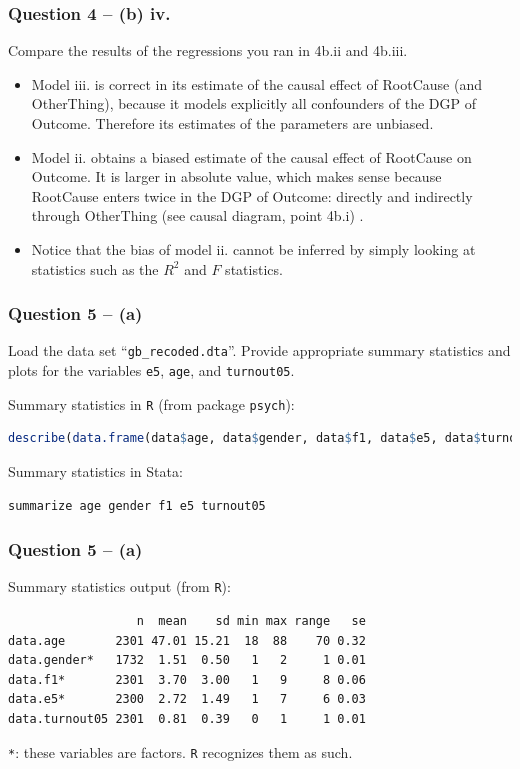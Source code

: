\documentclass[xcolor=table]{beamer}
\begin{document}
\begin{frame}
\frametitle{Question 4 -- (b) iv.}
Compare the results of the regressions you ran in 4b.ii and 4b.iii.  \pause

\begin{itemize}
\item Model iii. is correct in its estimate of the causal effect of RootCause (and OtherThing), because it models explicitly all confounders of the DGP of Outcome. \pause Therefore its estimates of the parameters are unbiased. \pause

\item Model ii. obtains a biased estimate of the causal effect of RootCause on Outcome. \pause It is larger in absolute value, which makes sense because RootCause enters twice in the DGP of Outcome: directly and indirectly through OtherThing (see causal diagram, point 4b.i) \pause.

\item Notice that the bias of model ii. cannot be inferred by simply looking at statistics such as the $R^2$ and $F$ statistics.
\end{itemize}
\end{frame}

\begin{frame}[fragile]
\frametitle{Question 5 -- (a)}
Load the data set ``\texttt{gb\_recoded.dta}''. Provide appropriate summary statistics and plots for the variables \texttt{e5}, \texttt{age}, and
\texttt{turnout05}. \pause

Summary statistics in \texttt{R} (from package \texttt{psych}):
\begin{lstlisting}[language = R]
describe(data.frame(data$age, data$gender, data$f1, data$e5, data$turnout05))
\end{lstlisting} \pause

Summary statistics in Stata:
\begin{lstlisting}
summarize age gender f1 e5 turnout05 
\end{lstlisting}
\end{frame}

\begin{frame}[fragile]
\frametitle{Question 5 -- (a)}
Summary statistics output (from \texttt{R}):
\begin{lstlisting}
                  n  mean    sd min max range   se
data.age       2301 47.01 15.21  18  88    70 0.32
data.gender*   1732  1.51  0.50   1   2     1 0.01
data.f1*       2301  3.70  3.00   1   9     8 0.06
data.e5*       2300  2.72  1.49   1   7     6 0.03
data.turnout05 2301  0.81  0.39   0   1     1 0.01
\end{lstlisting} \pause

\texttt{*}: these variables are factors. \texttt{R} recognizes them as such.
\end{frame}
\end{document}

